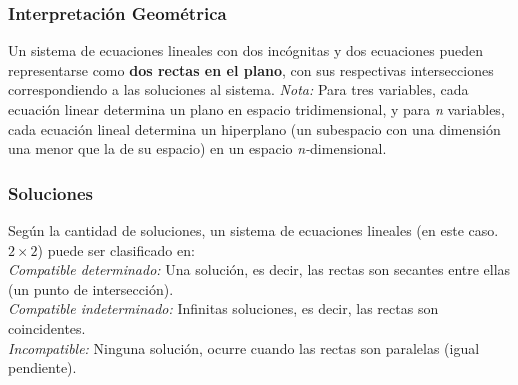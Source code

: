 \subsubsection{Interpretación Geométrica}
Un sistema de ecuaciones lineales con dos incógnitas y dos ecuaciones pueden representarse como \textbf{dos rectas en el plano}, con sus respectivas intersecciones correspondiendo a las soluciones al sistema.
\textit{Nota:} Para tres variables, cada ecuación linear determina un plano en espacio tridimensional, y para \textit{n} variables, cada ecuación lineal determina un hiperplano (un subespacio con una dimensión una menor que la de su espacio) en un espacio \textit{n-}dimensional.
\subsubsection{Soluciones}
Según la cantidad de soluciones, un sistema de ecuaciones lineales (en este caso. $2\times2$) puede ser clasificado en:\\

\textit{Compatible determinado:} Una solución, es decir, las rectas son secantes entre ellas (un punto de intersección).\\
\textit{Compatible indeterminado:} Infinitas soluciones, es decir, las rectas son coincidentes.\\
\textit{Incompatible:} Ninguna solución, ocurre cuando las rectas son paralelas (igual pendiente).\\